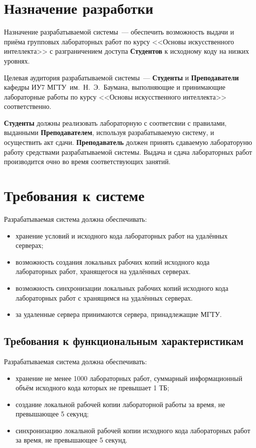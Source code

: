 \documentclass{bmstu}
\begin{document}
  \section{Назначение разработки}

  Назначение разрабатываемой системы~--- обеспечить возможность выдачи и приёма
  групповых лабораторных работ по курсу <<Основы искусственного интеллекта>> с
  разграничением доступа \textbf{Студентов} к исходному коду на низких уровнях.

  Целевая аудитория разрабатываемой системы~--- \textbf{Студенты} и
  \textbf{Преподаватели} кафедры ИУ7 МГТУ~им.~Н.~Э.~Баумана, выполняющие и
  принимающие лабораторные работы по курсу <<Основы искусственного интеллекта>>
  соответственно.

  \textbf{Студенты} должны реализовать лабораторную с соответсвии с правилами,
  выданными \textbf{Преподавателем}, используя разрабатываемую систему, и
  осуществить акт сдачи.
  \textbf{Преподаватель} должен принять сдаваемую лабораторуню работу
  средствами разрабатываемой системы.
  Выдача и сдача лабораторных работ производится очно во время соответствующих занятий.

  \section{Требования к системе}

  Разрабатываемая система должна обеспечивать:
  \begin{itemize}[label=---]
    \item хранение условий и исходного кода лабораторных работ на
      удалённых серверах;
    \item возможность создания локальных рабочих копий исходного кода
      лабораторных работ, хранящегося на удалённых серверах.
    \item возможность синхронизации локальных рабочих копий исходного
      кода лабораторных работ с хранящимся на удалённых серверах.
    \item за удаленные сервера принимаются сервера, принадлежащие МГТУ. 
  \end{itemize}

  \subsection{Требования к функциональным характеристикам}

  Разрабатываемая система должна обеспечивать:
  \begin{itemize}[label=---]
    \item хранение не менее 1000 лабораторных работ, суммарный
      информационный объём исходного кода которых не превышает 1 ТБ;
    \item создание локальной рабочей копии лабораторной работы за
      время, не превышающее 5 секунд;
    \item синхронизацию локальной рабочей копии исходного кода
      лабораторных работ за время, не превышающее 5 секунд.
  \end{itemize}
\end{document}

